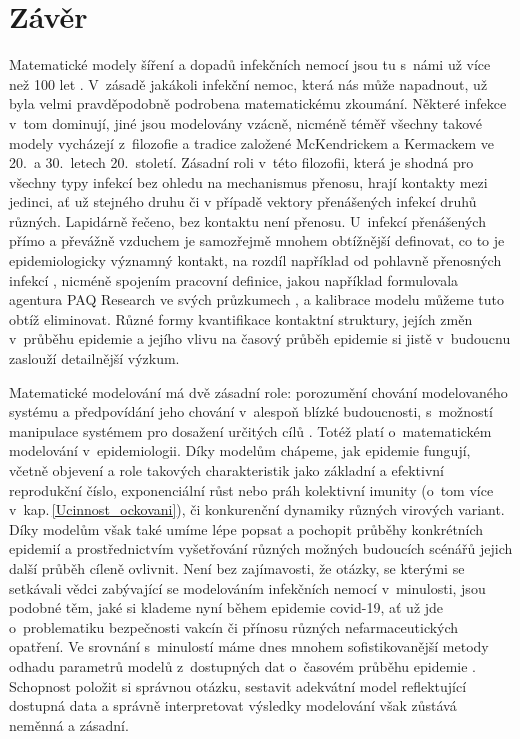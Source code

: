 \section*{Závěr}

Matematické modely šíření a dopadů infekčních nemocí jsou tu s~námi už více než 100 let \cite{AndersonMay1991,KeelingRohani2008,VynnyckyWhite2010}. V~zásadě jakákoli infekční nemoc, která nás může napadnout, už byla velmi pravděpodobně podrobena matematickému zkoumání. Některé infekce v~tom dominují, jiné jsou modelovány vzácně, nicméně téměř všechny takové modely vycházejí z~filozofie a tradice založené McKendrickem a Kermackem ve 20.\ a 30.\ letech 20.\ století. Zásadní roli v~této filozofii, která je shodná pro všechny typy infekcí bez ohledu na mechanismus přenosu, hrají kontakty mezi jedinci, ať už stejného druhu či v případě vektory přenášených infekcí druhů různých. Lapidárně řečeno, bez kontaktu není přenosu. U~infekcí přenášených přímo a převážně vzduchem je samozřejmě mnohem obtížnější definovat, co to je epidemiologicky významný kontakt, na rozdíl například od pohlavně přenosných infekcí \cite{Rao_etal2021}, nicméně spojením pracovní definice, jakou například formulovala agentura PAQ Research ve svých průzkumech \cite[\url{www.zivotbehempandemie.cz}]{paqcovid}, a kalibrace modelu můžeme tuto obtíž eliminovat. Různé formy kvantifikace kontaktní struktury, jejích změn v~průběhu epidemie a jejího vlivu na časový průběh epidemie si jistě v~budoucnu zaslouží detailnější výzkum.

Matematické modelování má dvě zásadní role: porozumění chování modelovaného systému a předpovídání jeho chování v~alespoň blízké budoucnosti, s~možností manipulace systémem pro dosažení určitých cílů \cite{GerleeLundh2016}. Totéž platí o~matematickém modelování v~epidemiologii. Díky modelům chápeme, jak epidemie fungují, včetně objevení a role takových charakteristik jako základní a efektivní reprodukční číslo, exponenciální růst nebo práh kolektivní imunity (o~tom více v~kap.\,\ref{Ucinnost_ockovani}), či konkurenční dynamiky různých virových variant. Díky modelům však také umíme lépe popsat a pochopit průběhy konkrétních epidemií a prostřednictvím vyšetřování různých možných budoucích scénářů jejich další průběh cíleně ovlivnit. Není bez zajímavosti, že otázky, se kterými se setkávali vědci zabývající se modelováním infekčních nemocí v~minulosti, jsou podobné těm, jaké si klademe nyní během epidemie covid-19, ať už jde o~problematiku bezpečnosti vakcín či přínosu různých nefarmaceutických opatření. Ve srovnání s~minulostí máme dnes mnohem sofistikovanější metody odhadu parametrů modelů z~dostupných dat o~časovém průběhu epidemie \cite{King_etal2016}. Schopnost položit si správnou otázku, sestavit adekvátní model reflektující dostupná data a správně interpretovat výsledky modelování však zůstává neměnná a zásadní.  

